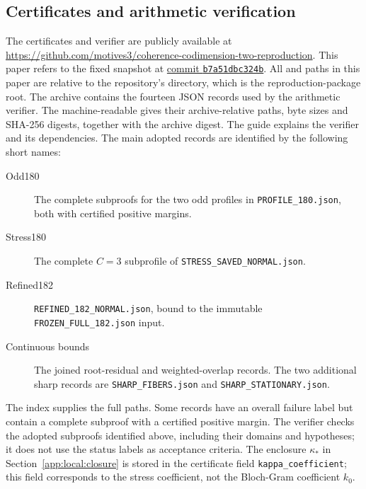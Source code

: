 \subsection{Certificates and arithmetic verification}
\label{app:certificates:reproducibility}
The certificates and verifier are publicly available at
\url{https://github.com/motives3/coherence-codimension-two-reproduction}.
This paper refers to the fixed snapshot at
\href{https://github.com/motives3/coherence-codimension-two-reproduction/tree/b7a51dbc324ba260a92c2fafd3642e686cefe91a}{commit \texttt{b7a51dbc324b}}.
All  and  paths in this paper are
relative to the repository's  directory, which is the
reproduction-package root.
The archive  contains the fourteen JSON
records used by the arithmetic verifier. The machine-readable
 gives their archive-relative paths, byte
sizes and SHA-256 digests, together with the archive digest. The guide
 explains the verifier and its
dependencies. The main adopted records are identified by the following
short names:
\begin{description}
\item[Odd180] The complete subproofs for the two odd profiles in
\texttt{PROFILE\_180.json}, both with certified positive margins.
\item[Stress180] The complete $C=3$ subprofile of
\texttt{STRESS\_SAVED\_NORMAL.json}.
\item[Refined182] \texttt{REFINED\_182\_NORMAL.json}, bound to the immutable
\texttt{FROZEN\_FULL\_182.json} input.
\item[Continuous bounds] The joined root-residual and weighted-overlap
records. The two additional sharp records are
\texttt{SHARP\_FIBERS.json} and \texttt{SHARP\_STATIONARY.json}.
\end{description}
The index supplies the full paths. Some records have an overall failure
label but contain a complete subproof with a certified positive margin.
The verifier checks the adopted subproofs identified above, including
their domains and hypotheses; it does not use the status labels as
acceptance criteria.
The enclosure $\kappa_*$ in Section~\ref{app:local:closure} is stored
in the certificate field \texttt{kappa\_coefficient}; this field
corresponds to the stress coefficient, not the Bloch-Gram coefficient $k_0$.

